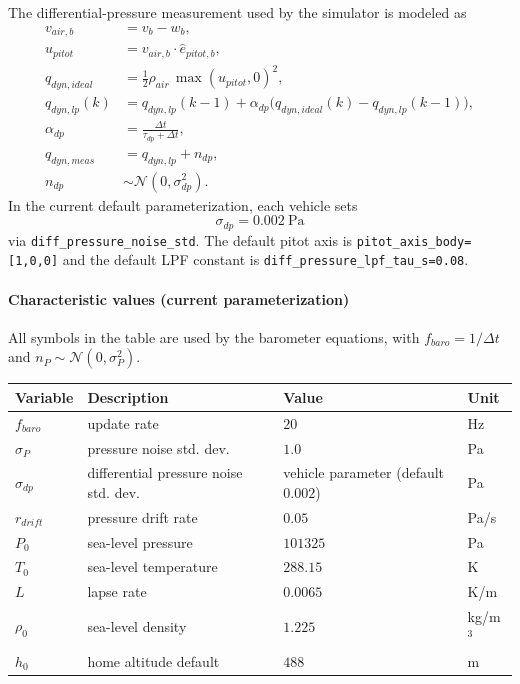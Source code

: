 \documentclass[11pt,a4paper]{article}
\begin{document}
The differential-pressure measurement used by the simulator is modeled as
\begin{align}
v_{air,b} &= v_b - w_b, \\
u_{pitot} &= v_{air,b} \cdot \hat e_{pitot,b}, \\
q_{dyn,ideal} &= \frac{1}{2}\rho_{air}\,\max(u_{pitot}, 0)^2, \\
q_{dyn,lp}(k) &= q_{dyn,lp}(k-1) + \alpha_{dp}\big(q_{dyn,ideal}(k)-q_{dyn,lp}(k-1)\big), \\
\alpha_{dp} &= \frac{\Delta t}{\tau_{dp}+\Delta t}, \\
q_{dyn,meas} &= q_{dyn,lp} + n_{dp}, \\
n_{dp} &\sim \mathcal{N}(0,\sigma_{dp}^2).
\end{align}
In the current default parameterization, each vehicle sets
\begin{equation}
\sigma_{dp} = 0.002\ \text{Pa}
\end{equation}
via \texttt{diff\_pressure\_noise\_std}. The default pitot axis is
\texttt{pitot\_axis\_body=[1,0,0]} and the default LPF constant is
\texttt{diff\_pressure\_lpf\_tau\_s=0.08}.

\paragraph{Characteristic values (current parameterization)}
All symbols in the table are used by the barometer equations, with $f_{baro}=1/\Delta t$ and $n_P\sim\mathcal{N}(0,\sigma_P^2)$.
\begin{center}
\begin{tabular}{llll}
\toprule
Variable & Description & Value & Unit \\
\midrule
$f_{baro}$ & update rate & $20$ & Hz \\
$\sigma_P$ & pressure noise std. dev. & $1.0$ & Pa \\
$\sigma_{dp}$ & differential pressure noise std. dev. & vehicle parameter (default $0.002$) & Pa \\
$r_{drift}$ & pressure drift rate & $0.05$ & Pa/s \\
$P_0$ & sea-level pressure & $101325$ & Pa \\
$T_0$ & sea-level temperature & $288.15$ & K \\
$L$ & lapse rate & $0.0065$ & K/m \\
$\rho_0$ & sea-level density & $1.225$ & kg/m$^3$ \\
$h_0$ & home altitude default & $488$ & m \\
\bottomrule
\end{tabular}
\end{center}
\end{document}

